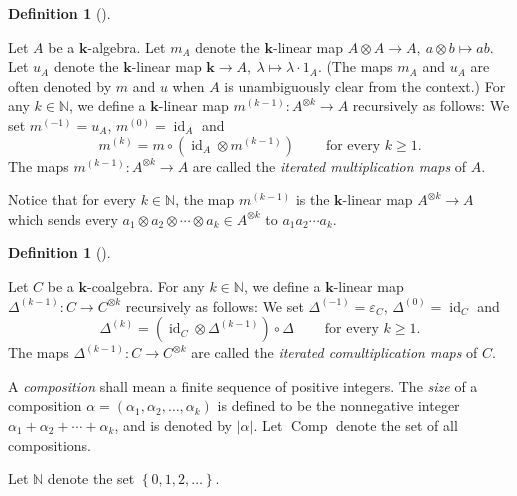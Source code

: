 \documentclass[numbers=enddot,12pt,final,onecolumn,notitlepage,abstracton]{scrartcl}%
\theoremstyle{definition}
\newtheorem{defi}[theo]{Definition}
\newenvironment{definition}[1][]
{\begin{defi}[#1]\begin{leftbar}}
{\end{leftbar}\end{defi}}
\begin{document}
\begin{definition}
\label{def.iterated-mult}Let $A$ be a $\mathbf{k}$-algebra. Let $m_{A}$ denote
the $\mathbf{k}$-linear map $A\otimes A\rightarrow A,\ a\otimes b\mapsto ab$.
Let $u_{A}$ denote the $\mathbf{k}$-linear map $\mathbf{k}\rightarrow
A,\ \lambda\mapsto\lambda\cdot1_{A}$. (The maps $m_{A}$ and $u_{A}$ are often
denoted by $m$ and $u$ when $A$ is unambiguously clear from the context.) For
any $k\in\mathbb{N}$, we define a $\mathbf{k}$-linear map $m^{\left(
k-1\right)  }:A^{\otimes k}\rightarrow A$ recursively as follows: We set
$m^{\left(  -1\right)  }=u_{A}$, $m^{\left(  0\right)  }=\operatorname*{id}%
\nolimits_{A}$ and%
\[
m^{\left(  k\right)  }=m\circ\left(  \operatorname*{id}\nolimits_{A}\otimes
m^{\left(  k-1\right)  }\right)  \ \ \ \ \ \ \ \ \ \ \text{for every }k\geq1.
\]
The maps $m^{\left(  k-1\right)  }:A^{\otimes k}\rightarrow A$ are called the
\textit{iterated multiplication maps} of $A$.

Notice that for every $k\in\mathbb{N}$, the map $m^{\left(
k-1\right)  }$ is the $\mathbf{k}$-linear map $A^{\otimes k}\rightarrow A$
which sends every $a_{1}\otimes a_{2}\otimes\cdots\otimes a_{k}\in A^{\otimes
k}$ to $a_{1}a_{2}\cdots a_{k}$.
\end{definition}

\begin{definition}
\label{def.iterated-comult}Let $C$ be a $\mathbf{k}$-coalgebra. For any
$k\in\mathbb{N}$, we define a $\mathbf{k}$-linear map $\Delta^{\left(
k-1\right)  }:C\rightarrow C^{\otimes k}$ recursively as follows: We set
$\Delta^{\left(  -1\right)  }=\varepsilon_{C}$, $\Delta^{\left(  0\right)
}=\operatorname*{id}\nolimits_{C}$ and%
\[
\Delta^{\left(  k\right)  }=\left(  \operatorname*{id}\nolimits_{C}%
\otimes\Delta^{\left(  k-1\right)  }\right)  \circ\Delta
\ \ \ \ \ \ \ \ \ \ \text{for every }k\geq1.
\]
The maps $\Delta^{\left(  k-1\right)  }:C\rightarrow C^{\otimes k}$ are called
the \textit{iterated comultiplication maps} of $C$.
\end{definition}

A \textit{composition} shall mean a finite sequence of positive integers. The
\textit{size} of a composition $\alpha=\left(  \alpha_{1},\alpha_{2}%
,\ldots,\alpha_{k}\right)  $ is defined to be the nonnegative integer
$\alpha_{1}+\alpha_{2}+\cdots+\alpha_{k}$, and is denoted by $\left\vert
\alpha\right\vert $. Let $\operatorname*{Comp}$ denote the set of all compositions.

Let $\mathbb{N}$ denote the set $\left\{  0,1,2,\ldots\right\}  $.
\end{document}

